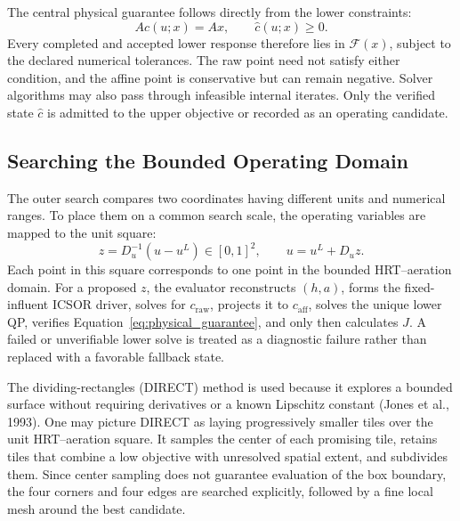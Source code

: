 \documentclass[a4paper,fleqn]{cas-sc}
\begin{document}
The central physical guarantee follows directly from the lower constraints:
\begin{equation}
\label{eq:physical_guarantee}
A\widehat c(u;x)=Ax,
\qquad
\widehat c(u;x)\geq0.
\end{equation}
Every completed and accepted lower response therefore lies in $\mathcal F(x)$, subject to the declared numerical tolerances. The raw point need not satisfy either condition, and the affine point is conservative but can remain negative. Solver algorithms may also pass through infeasible internal iterates. Only the verified state $\widehat c$ is admitted to the upper objective or recorded as an operating candidate.

\subsection{Searching the Bounded Operating Domain}

The outer search compares two coordinates having different units and numerical ranges. To place them on a common search scale, the operating variables are mapped to the unit square:
\begin{equation}
\label{eq:operating_normalization}
z=D_u^{-1}(u-u^L)\in[0,1]^2,
\qquad
u=u^L+D_uz.
\end{equation}
Each point in this square corresponds to one point in the bounded HRT--aeration domain. For a proposed $z$, the evaluator reconstructs $(h,a)$, forms the fixed-influent ICSOR driver, solves for $c_{\mathrm{raw}}$, projects it to $c_{\mathrm{aff}}$, solves the unique lower QP, verifies Equation~\eqref{eq:physical_guarantee}, and only then calculates $J$. A failed or unverifiable lower solve is treated as a diagnostic failure rather than replaced with a favorable fallback state.

The dividing-rectangles (DIRECT) method is used because it explores a bounded surface without requiring derivatives or a known Lipschitz constant (Jones et al., 1993). One may picture DIRECT as laying progressively smaller tiles over the unit HRT--aeration square. It samples the center of each promising tile, retains tiles that combine a low objective with unresolved spatial extent, and subdivides them. Since center sampling does not guarantee evaluation of the box boundary, the four corners and four edges are searched explicitly, followed by a fine local mesh around the best candidate.
\end{document}

